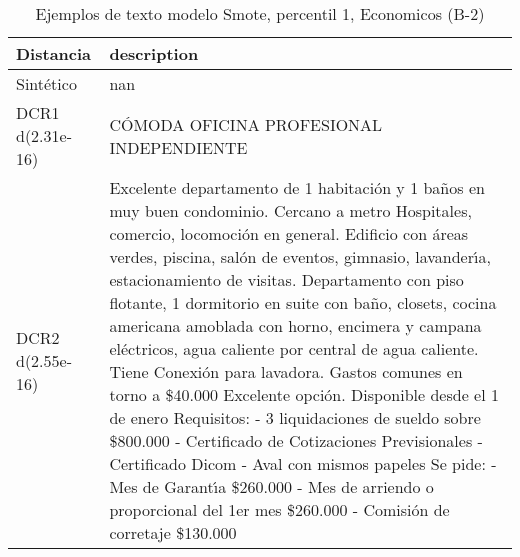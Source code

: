 \begin{table}[H]
\centering
\fontsize{10}{14}\selectfont
\caption{Ejemplos de texto modelo Smote, percentil 1, Economicos (B-2)}
\label{table-example-economicos-b-2-smote-enc-1p-text}
\begin{tabular}{|l|m{35em}|}
\hline
\rowcolor[gray]{0.8}
Distancia & description \\
\hline Sintético & nan \\
\hline DCR1 d(2.31e-16) & C\'OMODA OFICINA PROFESIONAL INDEPENDIENTE \\
\hline DCR2 d(2.55e-16) & Excelente departamento de 1 habitaci\'on y 1 ba\~nos en muy buen condominio. Cercano a metro Hospitales, comercio, locomoci\'on en general.  Edificio con \'areas verdes, piscina, sal\'on de eventos, gimnasio, lavander{\'\i}a, estacionamiento de visitas.  Departamento con piso flotante, 1 dormitorio en suite con ba\~no, closets, cocina americana amoblada con horno, encimera y campana el\'ectricos, agua caliente por central de agua caliente. Tiene Conexi\'on para lavadora. Gastos comunes en torno a \$40.000  Excelente opci\'on. Disponible desde el 1 de enero  Requisitos: - 3 liquidaciones de sueldo sobre \$800.000 - Certificado de Cotizaciones Previsionales - Certificado Dicom - Aval con mismos papeles  Se pide: - Mes de Garant{\'\i}a \$260.000 - Mes de arriendo o proporcional del 1er mes \$260.000 - Comisi\'on de corretaje \$130.000 \\
\hline
\end{tabular}
\end{table}
